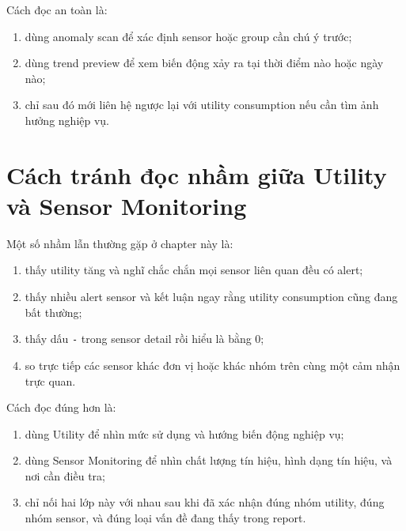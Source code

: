 Cách đọc an toàn là:

\begin{enumerate}[label=-]
\item dùng anomaly scan để xác định sensor hoặc group cần chú ý trước;
\item dùng trend preview để xem biến động xảy ra tại thời điểm nào hoặc ngày nào;
\item chỉ sau đó mới liên hệ ngược lại với utility consumption nếu cần tìm ảnh hưởng nghiệp vụ.
\end{enumerate}

\section{Cách tránh đọc nhầm giữa Utility và Sensor Monitoring}

Một số nhầm lẫn thường gặp ở chapter này là:

\begin{enumerate}[label=-]
\item thấy utility tăng và nghĩ chắc chắn mọi sensor liên quan đều có alert;
\item thấy nhiều alert sensor và kết luận ngay rằng utility consumption cũng đang bất thường;
\item thấy dấu \texttt{-} trong sensor detail rồi hiểu là bằng 0;
\item so trực tiếp các sensor khác đơn vị hoặc khác nhóm trên cùng một cảm nhận trực quan.
\end{enumerate}

Cách đọc đúng hơn là:

\begin{enumerate}[label=-]
\item dùng Utility để nhìn mức sử dụng và hướng biến động nghiệp vụ;
\item dùng Sensor Monitoring để nhìn chất lượng tín hiệu, hình dạng tín hiệu, và nơi cần điều tra;
\item chỉ nối hai lớp này với nhau sau khi đã xác nhận đúng nhóm utility, đúng nhóm sensor, và đúng loại vấn đề đang thấy trong report.
\end{enumerate}
